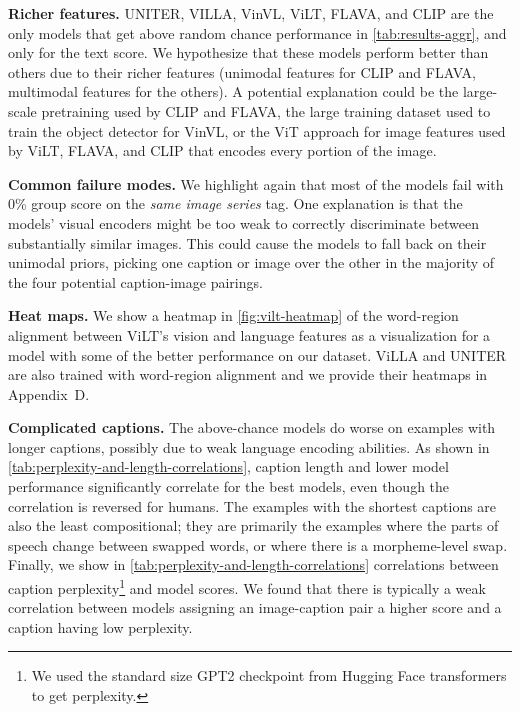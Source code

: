 \documentclass[10pt,twocolumn,letterpaper]{article}
\begin{document}
\textbf{Richer features.} UNITER, VILLA, VinVL, ViLT, FLAVA, and CLIP are the only models that get above random chance performance in \cref{tab:results-aggr}, and only for the text score.
We hypothesize that these models perform better than others due to their richer features (unimodal features for CLIP and FLAVA, multimodal features for the others).
A potential explanation could be the large-scale pretraining used by CLIP and FLAVA, the large training dataset used to train the object detector for VinVL, or the ViT approach for image features used by ViLT, FLAVA, and CLIP that encodes every portion of the image.


\textbf{Common failure modes.} We highlight again that most of the models fail with 0\% group score on the \textit{same image series} tag.
One explanation is that the models' visual encoders might be too weak to correctly discriminate between substantially similar images. This could cause the models to fall back on their unimodal priors, picking one caption or image over the other in the majority of the four potential caption-image pairings.


\textbf{Heat maps.} We show a heatmap in \cref{fig:vilt-heatmap} of the word-region alignment between ViLT's vision and language features as a visualization for a model with some of the better performance on our dataset. ViLLA and UNITER are also trained with word-region alignment and we provide their heatmaps in Appendix~D.





\textbf{Complicated captions.} The above-chance models do worse on examples with longer captions, possibly due to weak language encoding abilities. As shown in \cref{tab:perplexity-and-length-correlations}, caption length and lower model performance significantly correlate for the best models, even though the correlation is reversed for humans. The examples with the shortest captions are also the least compositional; they are primarily the examples where the parts of speech change between swapped words, or where there is a morpheme-level swap. Finally, we show in \cref{tab:perplexity-and-length-correlations} correlations between caption perplexity\footnote{We used the standard size GPT2 checkpoint from Hugging Face transformers to get perplexity\cite{wolf-etal-2020-transformers}.} and model scores. We found that there is typically a weak correlation between models assigning an image-caption pair a higher score and a caption having low perplexity.
\end{document}
